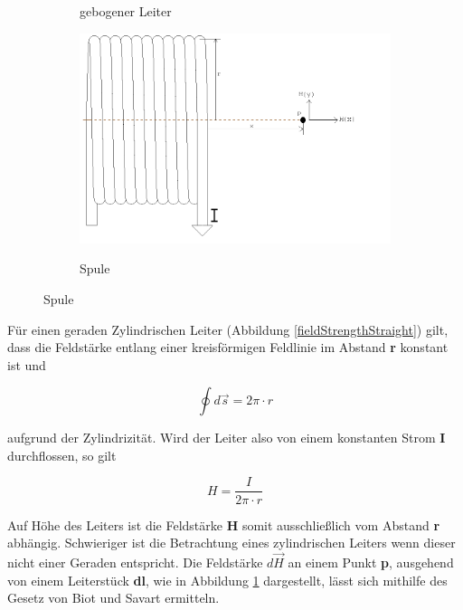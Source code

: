 {{\begin{figure}
\begin{minipage}[r]{0.5\textwidth}
\begin{figure}[H]
        \caption{gebogener Leiter}{}
        \label{fieldStrengthCurved}
      \end{figure}    
      \begin{figure}[H]
        \centering
        \includegraphics[width=1.2\textwidth]{Graphics/Spule.png}
        \caption{Spule}{}
        \label{coil}
      \end{figure}
    \vspace{-10pt}    
    \end{minipage}  
\end{figure}
\noindent Für einen geraden Zylindrischen Leiter (Abbildung \ref{fieldStrengthStraight}) gilt, dass die Feldstärke entlang einer kreisförmigen Feldlinie im Abstand \textbf{r} konstant ist und

\begin{equation}
  \oint d\vec{s} = 2\pi \cdot r
\end{equation}

\noindent aufgrund der Zylindrizität. Wird der Leiter also von einem konstanten Strom \textbf{I} durchflossen, so gilt

\begin{equation}
  H = \frac{I}{2\pi \cdot r}
\end{equation}

\noindent Auf Höhe des Leiters ist die Feldstärke \textbf{H} somit ausschließlich vom Abstand \textbf{r} abhängig. Schwieriger ist die Betrachtung eines zylindrischen Leiters wenn dieser nicht einer Geraden entspricht. Die Feldstärke \(d\vec{H}\) an einem Punkt \textbf{p}, ausgehend von einem Leiterstück \textbf{dl}, wie in Abbildung \ref{fieldStrengthCurved} dargestellt, lässt sich mithilfe des Gesetz von Biot und Savart ermitteln.

}}
